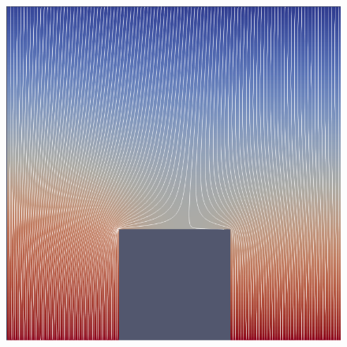 \begin{figure}[H]
	\centering
	
	\includegraphics[width=\textwidth]{../../19/streamlines20lvl7.png}
	
\end{figure}

\newpage
